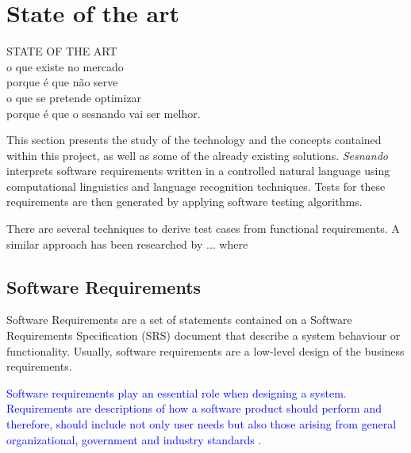 \chapter{State of the art}
\label{ch:sotart}

STATE OF THE ART\\
o que existe no mercado\\
porque é que não serve\\
o que se pretende optimizar\\
porque é que o sesnando vai ser melhor.


This section presents the study of the technology and the concepts contained within this project, as well as some of the already existing solutions. \textit{Sesnando} interprets software requirements written in a controlled natural language using computational linguistics and language recognition techniques. Tests for these requirements are then generated by applying software testing algorithms.

There are several techniques to derive test cases from functional
requirements. A similar approach has been researched by ... where



\section{Software Requirements}
\label{sec:software_requirements}

Software Requirements are a set of statements contained on a Software Requirements Specification (SRS) document that describe a system behaviour or functionality. Usually, software requirements are a low-level design of the business requirements. 

\textcolor{blue}{Software requirements play an essential role when designing a system. Requirements are descriptions of how a software product should perform and therefore, should include not only user needs but also those arising from general organizational, government and industry standards \cite{aurum_engineering_2005}.}

